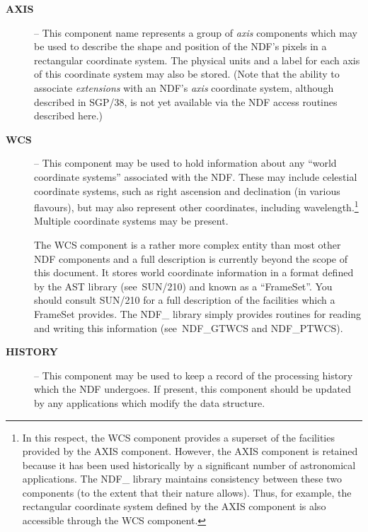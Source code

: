 \documentclass[twoside,11pt]{article}
\newcommand{\htmlref}[2]{#1}
\newcommand{\xref}[3]{#1}
\newcommand{\st}[1]{{\em{#1}}}
\begin{document}
\begin{description}

\item[{\bf AXIS}] -- This component name represents a group of \st{axis\/}
components which may be used to describe the shape and position of the NDF's
pixels in a rectangular coordinate system. 
The physical units and a label for each axis of this coordinate system may 
also be stored.
(Note that the ability to associate \st{extensions\/} with an NDF's
\st{axis\/} coordinate system, although described in 
\xref{SGP/38}{sgp38}{}, is not yet
available via the NDF access routines described here.) 

\item[{\bf WCS}] -- This component may be used to hold information
about any ``world coordinate systems'' associated with the NDF. These
may include celestial coordinate systems, such as right ascension and
declination (in various flavours), but may also represent other
coordinates, including wavelength.\footnote{In this respect, the WCS
component provides a superset of the facilities provided by the AXIS
component. However, the AXIS component is retained because it has been
used historically by a significant number of astronomical
applications. The NDF\_ library maintains consistency between these
two components (to the extent that their nature allows). Thus, for
example, the rectangular coordinate system defined by the AXIS
component is also accessible through the WCS component.}  Multiple
coordinate systems may be present.

The WCS component is a rather more complex entity than most other NDF
components and a full description is currently beyond the scope of
this document. It stores world coordinate information in a format
defined by the AST library (see~\xref{SUN/210}{sun210}{}) and known as
a ``\xref{FrameSet}{sun210}{FrameSet}''. You should consult SUN/210
for a full description of the facilities which a FrameSet
provides. The NDF\_ library simply provides routines for reading and
writing this information (see~\htmlref{NDF\_GTWCS}{NDF_GTWCS} and
\htmlref{NDF\_PTWCS}{NDF_PTWCS}).

\item[{\bf HISTORY}] -- This component may be used to keep a record of
the processing history which the NDF undergoes. 
If present, this component should be updated by any applications which
modify the data structure. 

\end{description}
\end{document}
